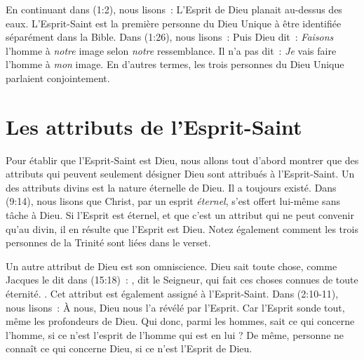 En continuant dans (1:2), nous lisons~:
 \og L'Esprit de Dieu planait au-dessus des eaux. \fg{}
 L'Esprit-Saint est la première personne du Dieu Unique à être identifiée
 séparément dans la Bible.
 Dans (1:26), nous lisons~:
 \og Puis Dieu dit~: \emph{Faisons} l'homme à \emph{notre} image
 selon \emph{notre} ressemblance. \fg{}
 Il n'a pas dit~: \og \emph{Je} vais faire l'homme à \emph{mon} image. \fg{}
 En d'autres termes, les trois personnes du Dieu Unique parlaient conjointement.

\section*{Les attributs de l'Esprit-Saint}

Pour établir que l'Esprit-Saint est Dieu, nous allons tout d'abord montrer
 que des attributs qui peuvent seulement désigner Dieu sont attribués à
 l'Esprit-Saint.
 Un des attributs divins est la nature éternelle de Dieu.
 Il a toujours existé. Dans (9:14), nous lisons que Christ,
 par un esprit \emph{éternel}, s'est offert lui-même sans tâche à Dieu.
 Si l'Esprit est éternel, et que c'est un attribut qui ne peut convenir
 qu'au divin, il en résulte que l'Esprit est Dieu.
 Notez également comment les trois personnes de la Trinité sont liées
 dans le verset.

Un autre attribut de Dieu est son omniscience. Dieu sait toute chose, comme
 Jacques le dit dans (15:18)~:
 \og [\dots{}], dit le Seigneur, qui fait ces choses connues de toute éternité. \fg{}
 .
 Cet attribut est également assigné à
 l'Esprit-Saint. Dans (2:10-11), nous lisons~: \og À nous, Dieu
 nous l'a révélé par l'Esprit. Car l'Esprit sonde tout, même les profondeurs de
 Dieu. Qui donc, parmi les hommes, sait ce qui concerne l'homme, si ce n'est
 l'esprit de l'homme qui est en lui ? De même, personne ne connaît ce qui
 concerne Dieu, si ce n'est l'Esprit de Dieu. \fg{}


